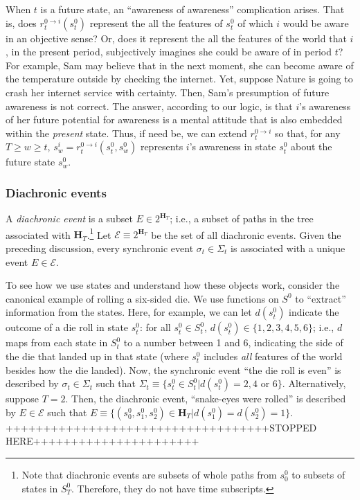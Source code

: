 \documentclass[
11pt,
titlepage,
reqno,
]{article}%
\theoremstyle{definition}
\begin{document}
When $t$ is a future state, an ``awareness of awareness'' complication arises.
That is, does $r^{0\rightarrow i}_t(s^0_t)$ represent the all the features of $s^0_t$ of which $i$  would be aware in an objective sense?
Or, does it represent the all the features of the world that $i$, in the present period, subjectively imagines she  could be aware of in period $t$?
For example, Sam may believe that in the next moment, she can become aware of the temperature outside by checking the internet. 
Yet, suppose Nature is going to crash her internet service with certainty.
Then, Sam's presumption of future awareness is not correct. 
The answer, according to our logic, is that $i$'s awareness of her future potential for awareness is a mental attitude that is also embedded within the \textit{present} state.
Thus, if need be, we can extend $r^{0\rightarrow i}_t$ so that, for any $T\ge w\ge t$, $s^i_w=r^{0\rightarrow i}_t(s^0_t,s^0_w)$ represents $i$'s awareness in state $s^0_t$ about the future state $s^0_w$.

\subsubsection{Diachronic events}


	
	A \textit{diachronic event} is a subset $E\in 2^{\mathbf{H}_T}$; i.e., a subset of paths in the tree associated with $\mathbf{H}_T$.\footnote
	{
		Note that diachronic events are subsets of whole paths from $s^0_0$ to subsets of states in $S^0_T$. 
		Therefore, they do not have time subscripts.
	}
	Let $\mathcal{E}\equiv 2^{\mathbf{H}_T}$ be the set of all diachronic events.
	Given the preceding discussion, every synchronic event $\sigma_t\in\Sigma_t$ is associated with a unique event $E\in \mathcal{E}$. 

	
	To see how we use states and understand how these objects work, consider the canonical example of rolling a six-sided die. 
	We use functions on $S^0$ to ``extract'' information from the states. 
	Here, for example, we can let $d(s^0_t)$ indicate the outcome of a die roll in state $s^0_t$: for all $s^0_t\in S^0_t$, $d(s^0_t)\in\{1,2,3,4,5,6\}$; i.e., $d$ maps from each state in $S^0_t$ to a number between 1 and 6, indicating the side of the die that landed up in that state (where $s^0_t$ includes \textit{all} features of the world besides how the die landed).
	Now, the synchronic event ``the die roll is even'' is described by $\sigma_t\in\Sigma_t$ such that $\Sigma_t\equiv\{s^0_t\in S^0_t|d(s^0_t)=2,4\text{ or }6\}$. 
	Alternatively, suppose $T=2$.
	Then, the diachronic event, ``snake-eyes were rolled'' is described by $E\in\mathcal{E}$ such that $E\equiv\{(s^0_0,s^0_1,s^0_2)\in \mathbf{H}_T|d(s^0_1)=d(s^0_2)=1\}$.
	 +++++++++++++++++++++++++++++++++++STOPPED HERE++++++++++++++++++++++
	
\end{document}
